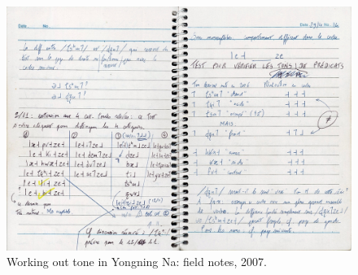 \largerpage
\begin{figure}[h!!]
	\includegraphics[width=.93\textwidth]{figures/ms/1029.jpg}
	\caption{Working out tone in Yongning Na: field notes, 2007.}
	\label{fig:ms2}
\end{figure}


